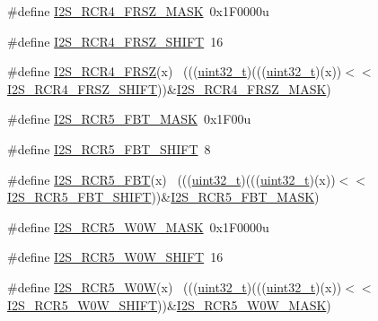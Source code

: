 \begin{DoxyCompactItemize}
\item 
\#define \hyperlink{group___i2_s___register___masks_ga8eda652c5a5ee719963f7103561bdc73}{I2\+S\+\_\+\+R\+C\+R4\+\_\+\+F\+R\+S\+Z\+\_\+\+M\+A\+SK}~0x1\+F0000u
\item 
\#define \hyperlink{group___i2_s___register___masks_gaae89e490a3b7562ea1a9a2992a6a97a7}{I2\+S\+\_\+\+R\+C\+R4\+\_\+\+F\+R\+S\+Z\+\_\+\+S\+H\+I\+FT}~16
\item 
\#define \hyperlink{group___i2_s___register___masks_ga7a99bde0c58a42d3efabc8a1feba3725}{I2\+S\+\_\+\+R\+C\+R4\+\_\+\+F\+R\+SZ}(x)                                              ~(((\hyperlink{_p_e___types_8h_a33594304e786b158f3fb30289278f5af}{uint32\+\_\+t})(((\hyperlink{_p_e___types_8h_a33594304e786b158f3fb30289278f5af}{uint32\+\_\+t})(x))$<$$<$\hyperlink{group___i2_s___register___masks_gaae89e490a3b7562ea1a9a2992a6a97a7}{I2\+S\+\_\+\+R\+C\+R4\+\_\+\+F\+R\+S\+Z\+\_\+\+S\+H\+I\+FT}))\&\hyperlink{group___i2_s___register___masks_ga8eda652c5a5ee719963f7103561bdc73}{I2\+S\+\_\+\+R\+C\+R4\+\_\+\+F\+R\+S\+Z\+\_\+\+M\+A\+SK})
\item 
\#define \hyperlink{group___i2_s___register___masks_ga54847f1139b421f0f0df7af775a11996}{I2\+S\+\_\+\+R\+C\+R5\+\_\+\+F\+B\+T\+\_\+\+M\+A\+SK}~0x1\+F00u
\item 
\#define \hyperlink{group___i2_s___register___masks_gabe8f4784a8f4ce3235e31483d0b6e5f4}{I2\+S\+\_\+\+R\+C\+R5\+\_\+\+F\+B\+T\+\_\+\+S\+H\+I\+FT}~8
\item 
\#define \hyperlink{group___i2_s___register___masks_gaa69c444a625365478b4193b077baa686}{I2\+S\+\_\+\+R\+C\+R5\+\_\+\+F\+BT}(x)                                                ~(((\hyperlink{_p_e___types_8h_a33594304e786b158f3fb30289278f5af}{uint32\+\_\+t})(((\hyperlink{_p_e___types_8h_a33594304e786b158f3fb30289278f5af}{uint32\+\_\+t})(x))$<$$<$\hyperlink{group___i2_s___register___masks_gabe8f4784a8f4ce3235e31483d0b6e5f4}{I2\+S\+\_\+\+R\+C\+R5\+\_\+\+F\+B\+T\+\_\+\+S\+H\+I\+FT}))\&\hyperlink{group___i2_s___register___masks_ga54847f1139b421f0f0df7af775a11996}{I2\+S\+\_\+\+R\+C\+R5\+\_\+\+F\+B\+T\+\_\+\+M\+A\+SK})
\item 
\#define \hyperlink{group___i2_s___register___masks_ga21ac7b9671ee42b3ff23e61fbc762bd6}{I2\+S\+\_\+\+R\+C\+R5\+\_\+\+W0\+W\+\_\+\+M\+A\+SK}~0x1\+F0000u
\item 
\#define \hyperlink{group___i2_s___register___masks_ga1b13ac40203b26b4adeb037896cbb88e}{I2\+S\+\_\+\+R\+C\+R5\+\_\+\+W0\+W\+\_\+\+S\+H\+I\+FT}~16
\item 
\#define \hyperlink{group___i2_s___register___masks_ga1b8eaf4b22bdc3c7a066c003ca9809c7}{I2\+S\+\_\+\+R\+C\+R5\+\_\+\+W0W}(x)                                                ~(((\hyperlink{_p_e___types_8h_a33594304e786b158f3fb30289278f5af}{uint32\+\_\+t})(((\hyperlink{_p_e___types_8h_a33594304e786b158f3fb30289278f5af}{uint32\+\_\+t})(x))$<$$<$\hyperlink{group___i2_s___register___masks_ga1b13ac40203b26b4adeb037896cbb88e}{I2\+S\+\_\+\+R\+C\+R5\+\_\+\+W0\+W\+\_\+\+S\+H\+I\+FT}))\&\hyperlink{group___i2_s___register___masks_ga21ac7b9671ee42b3ff23e61fbc762bd6}{I2\+S\+\_\+\+R\+C\+R5\+\_\+\+W0\+W\+\_\+\+M\+A\+SK})
$$
\end{DoxyCompactItemize}
